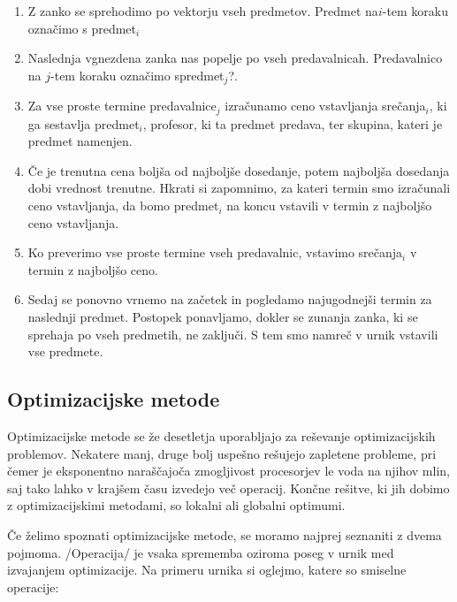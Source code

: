 \documentclass[a4paper,10pt]{article}
\begin{document}
   
   \begin{enumerate}
      \item Z zanko se sprehodimo po vektorju vseh predmetov. Predmet na\(i\)-tem koraku
      označimo s predmet\(_i\)
   
      \item Naslednja vgnezdena zanka nas popelje po vseh predavalnicah. Predavalnico na
      \(j\)-tem koraku označimo spredmet\(_j\)?.
   
      \item Za vse proste termine predavalnice\(_j\) izračunamo ceno vstavljanja
      srečanja\(_i\), ki ga sestavlja predmet\(_i\), profesor, ki ta predmet predava,
      ter skupina, kateri je predmet namenjen.
   
      \item Če je trenutna cena boljša od najboljše dosedanje, potem najboljša dosedanja
      dobi vrednost trenutne. Hkrati si zapomnimo, za kateri termin smo izračunali ceno
      vstavljanja, da bomo predmet\(_i\) na koncu vstavili v termin z najboljšo
      ceno vstavljanja.
   
      \item Ko preverimo vse proste termine vseh predavalnic, vstavimo srečanja\(_i\)
      v termin z najboljšo ceno.
   
      \item Sedaj se ponovno vrnemo na začetek in pogledamo najugodnejši termin za naslednji
      predmet. Postopek ponavljamo, dokler se zunanja zanka, ki se sprehaja po vseh predmetih,
      ne zaključi. S tem smo namreč v urnik vstavili vse predmete.
   
   \end{enumerate}
\subsection{Optimizacijske metode} %

Optimizacijske metode se že desetletja uporabljajo za reševanje optimizacijskih problemov.
Nekatere manj, druge bolj uspešno rešujejo zapletene probleme, pri čemer je eksponentno
naraščajoča zmogljivost procesorjev le voda na njihov mlin, saj tako lahko v krajšem
času izvedejo več operacij. Končne rešitve, ki jih dobimo z optimizacijskimi metodami,
so lokalni ali globalni optimumi.

Če želimo spoznati optimizacijske metode, se moramo najprej seznaniti z dvema pojmoma.
/Operacija/ je vsaka sprememba oziroma poseg v urnik med izvajanjem optimizacije.
Na primeru urnika si oglejmo, katere so smiselne operacije:
\end{document}
